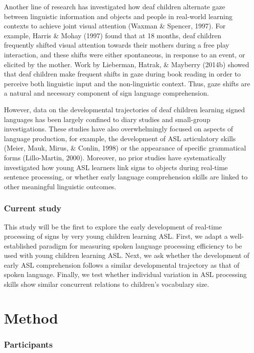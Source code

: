 \documentclass[12pt,]{article}
\begin{document}
Another line of research has investigated how deaf children alternate
gaze between linguistic information and objects and people in real-world
learning contexts to achieve joint visual attention (Waxman \& Spencer,
1997). For example, Harris \& Mohay (1997) found that at 18 months, deaf
children frequently shifted visual attention towards their mothers
during a free play interaction, and these shifts were either
spontaneous, in response to an event, or elicited by the mother. Work by
Lieberman, Hatrak, \& Mayberry (2014b) showed that deaf children make
frequent shifts in gaze during book reading in order to perceive both
linguistic input and the non-linguistic context. Thus, gaze shifts are a
natural and necessary component of sign language comprehension.

However, data on the developmental trajectories of deaf children
learning signed languages has been largely confined to diary studies and
small-group investigations. These studies have also overwhelmingly
focused on aspects of language production, for example, the development
of ASL articulatory skills (Meier, Mauk, Mirus, \& Conlin, 1998) or the
appearance of specific grammatical forms (Lillo-Martin, 2000). Moreover,
no prior studies have systematically investigated how young ASL learners
link signs to objects during real-time sentence processing, or whether
early language comprehension skills are linked to other meaningful
linguistic outcomes.

\subsubsection{Current study}\label{current-study}

This study will be the first to explore the early development of
real-time processing of signs by very young children learning ASL.
First, we adapt a well-established paradigm for measuring spoken
language processing efficiency to be used with young children learning
ASL. Next, we ask whether the development of early ASL comprehension
follows a similar developmental trajectory as that of spoken language.
Finally, we test whether individual variation in ASL processing skills
show similar concurrent relations to children's vocabulary size.

\section{Method}\label{method}

\subsubsection{Participants}\label{participants}
\end{document}
